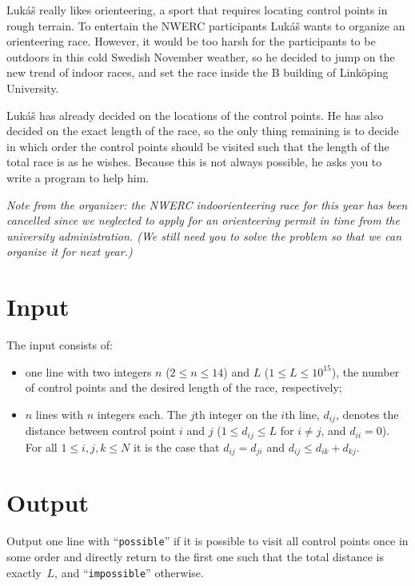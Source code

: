 
%

\newcommand{\Lukas}{Luk\'a\v{s}}%
\noindent
\Lukas{} really likes orienteering, a sport that requires locating control points in rough terrain. To entertain the NWERC participants \Lukas{} wants to organize an orienteering race. However, it would be too harsh for the participants to be outdoors in this cold Swedish November weather, so he decided to jump on the new trend of indoor races, and set the race inside the B building of Linköping University.

\Lukas{} has already decided on the locations of the control points. He has also decided on the exact length of the race, so the only thing remaining is to decide in which order the control points should be visited such that the length of the total race is as he wishes. Because this is not always possible, he asks you to write a program to help him.

\emph{Note from the organizer: the NWERC indoorienteering race for this year has been cancelled since we neglected to apply for an orienteering permit in time from the university administration.  (We still need you to solve the problem so that we can organize it for next year.)}


\section*{Input}

The input consists of:
\begin{itemize}
   \item one line with two integers $n$ ($2\leq n \leq 14$) and $L$ ($1 \leq L \leq 10^{15}$), the number of control points and the desired length of the race, respectively;
   \item $n$ lines with $n$ integers each.  The $j$th integer on the $i$th line, $d_{ij}$, denotes the distance between control point $i$ and $j$  ($1\leq d_{ij} \leq L$ for $i \not= j$, and $d_{ii} = 0$). For all $1 \leq i,j,k \leq N$ it is the case that $d_{ij} = d_{ji}$ and $d_{ij} \leq d_{ik} + d_{kj}$.
\end{itemize}

\section*{Output}

Output one line with ``\texttt{possible}'' if it is possible to visit all control points once in some order and directly return to the first one such that the total distance is exactly~$L$, and ``\texttt{impossible}'' otherwise.
